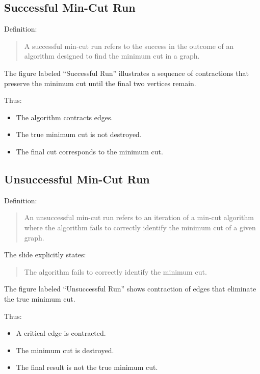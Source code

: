\documentclass[12pt]{article}
\begin{document}
\subsection{Successful Min-Cut Run}

Definition:

\begin{quote}
A successful min-cut run refers to the success in the outcome of an algorithm designed to find the minimum cut in a graph.
\end{quote}

The figure labeled “Successful Run” illustrates a sequence of contractions that preserve the minimum cut until the final two vertices remain.

Thus:

\begin{itemize}
    \item The algorithm contracts edges.
    \item The true minimum cut is not destroyed.
    \item The final cut corresponds to the minimum cut.
\end{itemize}

\subsection{Unsuccessful Min-Cut Run}

Definition:

\begin{quote}
An unsuccessful min-cut run refers to an iteration of a min-cut algorithm where the algorithm fails to correctly identify the minimum cut of a given graph.
\end{quote}

The slide explicitly states:

\begin{quote}
The algorithm fails to correctly identify the minimum cut.
\end{quote}

The figure labeled “Unsuccessful Run” shows contraction of edges that eliminate the true minimum cut.

Thus:

\begin{itemize}
    \item A critical edge is contracted.
    \item The minimum cut is destroyed.
    \item The final result is not the true minimum cut.
\end{itemize}
\end{document}

